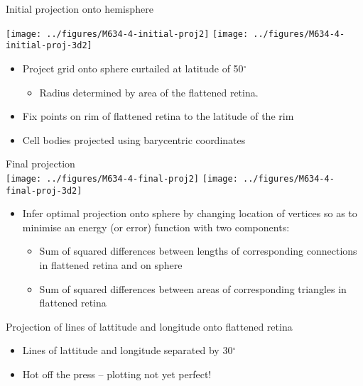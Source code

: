 \documentclass{article}
\newcommand{\frametitle}[1]{{\vspace{0.1in}\color{blue}\Huge #1}\\\vspace{0.2in}}
\renewenvironment{frame}{\pagebreak[4]\LARGE

}{}
\begin{document}
\begin{frame}
  \frametitle{Initial projection onto hemisphere}

  \texttt{[image: ../figures/M634-4-initial-proj2]}
  \texttt{[image: ../figures/M634-4-initial-proj-3d2]}
  \begin{itemize}
  \item Project grid onto sphere curtailed at latitude of 50$^\circ$
    \begin{itemize}
    \item Radius determined by area of the flattened retina.
    \end{itemize}
  \item Fix points on rim of flattened retina to the latitude of the rim
  \item Cell bodies projected using barycentric coordinates

  \end{itemize}

\end{frame}

\begin{frame}
  \frametitle{Final projection}
  \texttt{[image: ../figures/M634-4-final-proj2]}
  \texttt{[image: ../figures/M634-4-final-proj-3d2]}

  
  \begin{itemize}
  \item Infer optimal projection onto sphere by changing location of
    vertices so as to minimise an energy (or error) function with two
    components:
  \begin{itemize}
  \item Sum of squared differences between lengths of corresponding
    connections in flattened retina and on sphere
  \item Sum of squared differences between areas of corresponding
    triangles in flattened retina
  \end{itemize}
  \end{itemize}

\end{frame}

\begin{frame}
  \frametitle{Projection of lines of lattitude and longitude onto
    flattened retina}


  \begin{itemize}
  \item Lines of lattitude and longitude separated by 30$^\circ$
  \item Hot off the press -- plotting not yet perfect!
  \end{itemize}

\end{frame}
\end{document}
